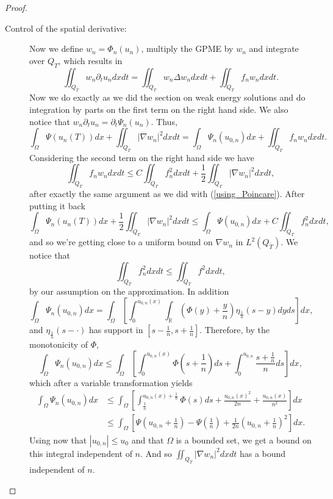 \documentclass[11pt, a4paper]{article}
\begin{document}
\begin{proof}
\begin{description}
	\item[Control of the spatial derivative:] Now we define $w_n = \Phi_n(u_n)$, multiply the GPME by $w_n$ and integrate over $Q_T$, which results in
	\begin{equation*}
	\iint_{Q_T}w_n\partial_t u_n dxdt = \iint_{Q_T}w_n\Delta w_n dxdt + \iint_{Q_T}f_n w_n dxdt.
	\end{equation*}
	Now we do exactly as we did the section on weak energy solutions and do integration by parts on the first term on the right hand side. We also notice that $w_n \partial_t u_n = \partial_t \Psi_n(u_n)$. Thus,
	\begin{equation*}
	\int_\Omega \Psi(u_n(T))dx + \iint_{Q_T}|\nabla w_n|^2dxdt = \int_\Omega \Psi_n(u_{0,n})dx + \iint_{Q_T}f_n w_n dxdt.
	\end{equation*}
	Considering the second term on the right hand side we have
	\begin{equation*}
	\iint_{Q_T}f_n w_n dxdt \leq C\iint_{Q_T}f_n^2 dxdt + \frac{1}{2}\iint_{Q_T}|\nabla w_n|^2dxdt,
	\end{equation*}
	after exactly the same argument as we did with (\ref{using_Poincare}). After putting it back
	\begin{equation*}
	\int_\Omega \Psi_n(u_n(T))dx + \frac{1}{2}\iint_{Q_T}|\nabla w_n|^2 dxdt \leq \int_\Omega \Psi(u_{0,n})dx + C\iint_{Q_T}f_n^2 dxdt,
	\end{equation*}
	and so we're getting close to a uniform bound on $\nabla w_n$ in $L^2(Q_T)$. We notice that
	\begin{equation*}
	\iint_{Q_T}f_n^2dxdt \leq \iint_{Q_T} f^2 dxdt,
	\end{equation*}
	by our assumption on the approximation. In addition
	\begin{equation*}
	\int_\Omega \Psi_n(u_{0,n})dx = \int_\Omega \left[ \int_0^{u_{0,n}(x)} \int_\mathbb{R} \left(\Phi(y)+\frac{y}{n}\right)\eta_{\frac{1}{n}}(s-y)dy ds \right] dx,
	\end{equation*}
	and $\eta_{\frac{1}{n}}(s-\cdot)$ has support in $[s-\frac{1}{n}, s + \frac{1}{n}]$. Therefore, by the monotonicity of $\Phi$, 
	\begin{equation*}
	\int_\Omega \Psi_n(u_{0,n})dx \leq \int_\Omega \left[ \int_0^{u_{0,n}(x)}\Phi \left(s+\frac{1}{n} \right)ds + \int_0^{u_{0,n}}\frac{s+\frac{1}{n}}{n}ds \right] dx,
	\end{equation*}
	which after a variable transformation yields
	\begin{align*}
	\int_\Omega \Psi_n(u_{0,n})dx &\leq \int_\Omega \left[ \int_{\frac{1}{n} }^{u_{0,n}(x) + \frac{1}{n} } \Phi(s)ds + \frac{u_{0,n}(x)^2}{2n} + \frac{u_{0,n}(x)}{n^2} \right] dx \\
	&\leq \int_\Omega \left[ \Psi\left(u_{0,n} +\frac{1}{n}\right) - \Psi\left(\frac{1}{n}\right) + \frac{1}{2n}\left(u_{0,n} + \frac{1}{n}\right)^2 \right] dx.
	\end{align*}
	Using now that $|u_{0,n}| \leq u_0$ and that $\Omega$ is a bounded set, we get a bound on this integral independent of $n$. And so $\iint_{Q_T} |\nabla w_n|^2 dxdt$ has a bound independent of $n$.
	

\end{description}
\end{proof}
\end{document}

